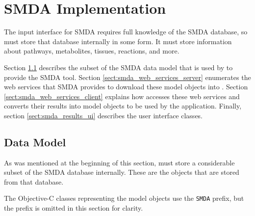 \section{SMDA Implementation}
\label{sect:smda_implementation}

The input interface for SMDA requires full knowledge of the SMDA database, so
\mawapp must store that database internally in some form. It must store
information about pathways, metabolites, tissues, reactions, and more.

Section \ref{sect:smda_data_model} describes the subset of the SMDA data
model that is used by \mawapp to provide the SMDA tool. Section
\ref{sect:smda_web_services_server} enumerates the web services that
SMDA provides to download these model objects into \mawapp. Section
\ref{sect:smda_web_services_client} explains how \mawapp accesses these web
services and converts their results into model objects to be used by the
application. Finally, section \ref{sect:smda_results_ui} describes the user
interface classes.

\subsection{Data Model}
\label{sect:smda_data_model}

As was mentioned at the beginning of this section, \mawapp must store a
considerable subset of the SMDA database internally. These are the objects that
are stored from that database.

The Objective-C classes representing the model objects use the \texttt{SMDA}
prefix, but the prefix is omitted in this section for clarity.

